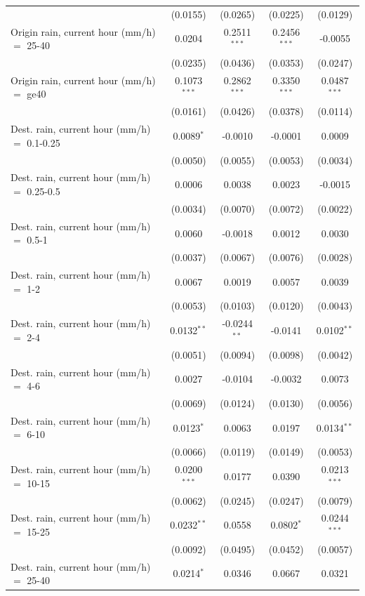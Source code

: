 \begin{tabular}{lcccc}
    & (0.0155) & (0.0265) & (0.0225) & (0.0129)\\
   Origin rain, current hour (mm/h) $=$ 25-40 & 0.0204 & 0.2511$^{***}$ & 0.2456$^{***}$ & -0.0055\\
    & (0.0235) & (0.0436) & (0.0353) & (0.0247)\\
   Origin rain, current hour (mm/h) $=$ ge40 & 0.1073$^{***}$ & 0.2862$^{***}$ & 0.3350$^{***}$ & 0.0487$^{***}$\\
    & (0.0161) & (0.0426) & (0.0378) & (0.0114)\\
   Dest. rain, current hour (mm/h) $=$ 0.1-0.25 & 0.0089$^{*}$ & -0.0010 & -0.0001 & 0.0009\\
    & (0.0050) & (0.0055) & (0.0053) & (0.0034)\\
   Dest. rain, current hour (mm/h) $=$ 0.25-0.5 & 0.0006 & 0.0038 & 0.0023 & -0.0015\\
    & (0.0034) & (0.0070) & (0.0072) & (0.0022)\\
   Dest. rain, current hour (mm/h) $=$ 0.5-1 & 0.0060 & -0.0018 & 0.0012 & 0.0030\\
    & (0.0037) & (0.0067) & (0.0076) & (0.0028)\\
   Dest. rain, current hour (mm/h) $=$ 1-2 & 0.0067 & 0.0019 & 0.0057 & 0.0039\\
    & (0.0053) & (0.0103) & (0.0120) & (0.0043)\\
   Dest. rain, current hour (mm/h) $=$ 2-4 & 0.0132$^{**}$ & -0.0244$^{**}$ & -0.0141 & 0.0102$^{**}$\\
    & (0.0051) & (0.0094) & (0.0098) & (0.0042)\\
   Dest. rain, current hour (mm/h) $=$ 4-6 & 0.0027 & -0.0104 & -0.0032 & 0.0073\\
    & (0.0069) & (0.0124) & (0.0130) & (0.0056)\\
   Dest. rain, current hour (mm/h) $=$ 6-10 & 0.0123$^{*}$ & 0.0063 & 0.0197 & 0.0134$^{**}$\\
    & (0.0066) & (0.0119) & (0.0149) & (0.0053)\\
   Dest. rain, current hour (mm/h) $=$ 10-15 & 0.0200$^{***}$ & 0.0177 & 0.0390 & 0.0213$^{***}$\\
    & (0.0062) & (0.0245) & (0.0247) & (0.0079)\\
   Dest. rain, current hour (mm/h) $=$ 15-25 & 0.0232$^{**}$ & 0.0558 & 0.0802$^{*}$ & 0.0244$^{***}$\\
    & (0.0092) & (0.0495) & (0.0452) & (0.0057)\\
   Dest. rain, current hour (mm/h) $=$ 25-40 & 0.0214$^{*}$ & 0.0346 & 0.0667 & 0.0321\\

\end{tabular}
